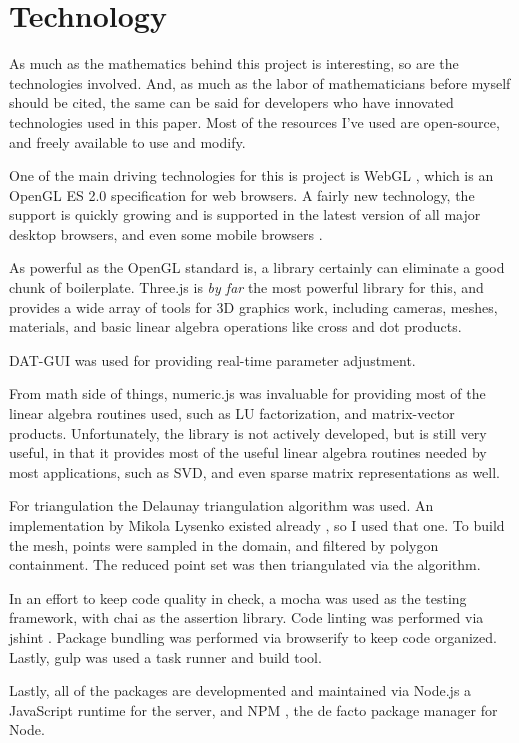 \section{Technology}

As much as the mathematics behind this project is interesting, so are the technologies involved. And, as much as the
labor of mathematicians before myself should be cited, the same can be said for developers who have innovated
technologies used in this paper. Most of the resources I've used are open-source, and freely available to use and
modify.

One of the main driving technologies for this is project is WebGL \cite{webgl}, which is an OpenGL ES 2.0 specification
for web browsers. A fairly new technology, the support is quickly growing and is supported in the latest version of
all major desktop browsers, and even some mobile browsers \cite{caniuse_webgl}.

As powerful as the OpenGL standard is, a library certainly can eliminate a good chunk of boilerplate. Three.js
\cite{threejs} is \emph{by far} the most powerful library for this, and provides a wide array of tools for 3D
graphics work, including cameras, meshes, materials, and basic linear algebra operations like cross and dot products.

DAT-GUI \cite{datgui} was used for providing real-time parameter adjustment.

From math side of things, numeric.js \cite{numericjs} was invaluable for providing most of the linear algebra routines
used, such as LU factorization, and matrix-vector products. Unfortunately, the library is not actively developed, but is
still very useful, in that it provides most of the useful linear algebra routines needed by most applications, such as
SVD, and even sparse matrix representations as well.

For triangulation the Delaunay triangulation algorithm \cite{triangulation} was used. An implementation by Mikola
Lysenko existed already \cite{delaunay}, so I used that one. To build the mesh, points were sampled in the domain,
and filtered by polygon containment. The reduced point set was then triangulated via the algorithm.

In an effort to keep code quality in check, a mocha \cite{mocha} was used as the testing framework, with chai
\cite{chai} as the assertion library. Code linting was performed via jshint \cite{jshint}. Package bundling was
performed via browserify \cite{browserify} to keep code organized. Lastly, gulp \cite{gulp} was used a task runner
and build tool.

Lastly, all of the packages are developmented and maintained via Node.js \cite{node} a JavaScript runtime for the server,
and NPM \cite{npm}, the de facto package manager for Node.
